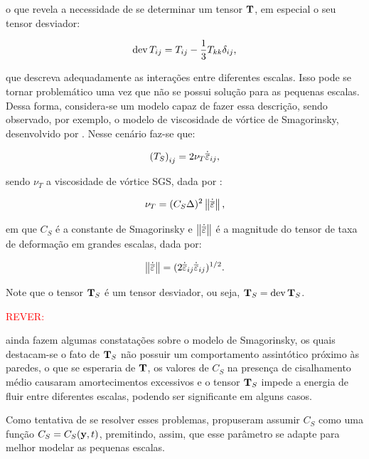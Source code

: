 \documentclass[_ArquivoPrincipal.tex]{subfiles}
\begin{document}
\noindent o que revela a necessidade de se determinar um tensor $\mathbf{T}$, em especial o seu tensor desviador:

\begin{equation}
    \mathop{\mathrm{dev}}\nolimits{T_{ij}}=T_{ij}-\frac{1}{3}T_{kk}\delta_{ij}\text{,}
\end{equation}

\noindent que descreva adequadamente as interações entre diferentes escalas. Isso pode se tornar problemático uma vez que não se possui solução para as pequenas escalas. Dessa forma, considera-se um modelo capaz de fazer essa descrição, sendo observado, por exemplo, o modelo de viscosidade de vórtice de Smagorinsky, desenvolvido por . Nesse cenário faz-se que:

\begin{equation}
    \left({T_S}\right)_{ij}=2\nu_T\dot{\overline{\varepsilon}}_{ij}\text{,}
\end{equation}

\noindent sendo $\nu_T$ a viscosidade de vórtice SGS, dada por \cite{germano1991dynamic,piomelli1999large,hughes2000large}:

\begin{equation}
    \nu_T=(C_S\Delta)^2\left\lVert{\dot{\overline{\mathbf{\varepsilon}}}}\right\lVert\text{,}
\end{equation}

\noindent em que $C_S$ é a constante de Smagorinsky e $\left\lVert{\dot{\overline{\mathbf{\varepsilon}}}}\right\lVert$ é a magnitude do tensor de taxa de deformação em grandes escalas, dada por:

\begin{equation}
    \left\lVert{\dot{\overline{\mathbf{\varepsilon}}}}\right\lVert=(2\dot{\overline{\varepsilon}}_{ij}\dot{\overline{\varepsilon}}_{ij})^{1/2}\text{.}
\end{equation}

Note que o tensor $\mathbf{T}_S$ é um tensor desviador, ou seja, $\mathbf{T}_S=\mathop{\mathrm{dev}}\nolimits{\mathbf{T}_S}$.

\textcolor{red}{REVER:}

 ainda fazem algumas constatações sobre o modelo de Smagorinsky, os quais destacam-se o fato de $\mathbf{T}_S$ não possuir um comportamento assintótico próximo às paredes, o que se esperaria de $\mathbf{T}$, os valores de $C_S$ na presença de cisalhamento médio causaram amortecimentos excessivos e o tensor $\mathbf{T}_S$ impede a energia de fluir entre diferentes escalas, podendo ser significante em alguns casos.

Como tentativa de se resolver esses problemas,  propuseram assumir $C_S$ como uma função $C_S=C_S(\mathbf{y},t)$, premitindo, assim, que esse parâmetro se adapte para melhor modelar as pequenas escalas.
\end{document}

